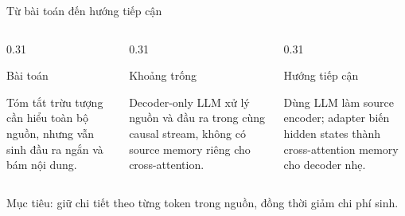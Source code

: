 \documentclass[aspectratio=169,11pt]{beamer}
\begin{document}
\begin{frame}{Từ bài toán đến hướng tiếp cận}
  \vspace{0.4em}
  \begin{columns}[T,onlytextwidth]
    \begin{column}{0.31\textwidth}
      \begin{block}{Bài toán}
        \begin{minipage}[t][2.05cm][t]{\linewidth}
        \raggedright Tóm tắt trừu tượng cần hiểu toàn bộ nguồn, nhưng vẫn sinh đầu ra ngắn và bám nội dung.
        \end{minipage}
      \end{block}
    \end{column}
    \begin{column}{0.31\textwidth}
      \begin{block}{Khoảng trống}
        \begin{minipage}[t][2.05cm][t]{\linewidth}
        \raggedright Decoder-only LLM xử lý nguồn và đầu ra trong cùng causal stream, không có source memory riêng cho cross-attention.
        \end{minipage}
      \end{block}
    \end{column}
    \begin{column}{0.31\textwidth}
      \begin{block}{Hướng tiếp cận}
        \begin{minipage}[t][2.05cm][t]{\linewidth}
        \raggedright Dùng LLM làm source encoder; adapter biến hidden states thành cross-attention memory cho decoder nhẹ.
        \end{minipage}
      \end{block}
    \end{column}
  \end{columns}

  \vfill
  \begin{center}
    \normalsize\alert{Mục tiêu: giữ chi tiết theo từng token trong nguồn, đồng thời giảm chi phí sinh.}
  \end{center}
\end{frame}
\end{document}
